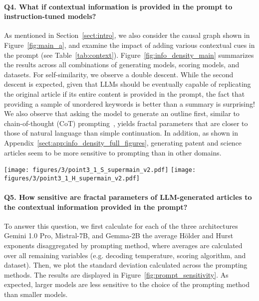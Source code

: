 \paragraph{Q4. What if contextual information is provided in the prompt to instruction-tuned models?}
As mentioned in Section~\ref{sect:intro}, we also consider the causal graph shown in Figure~\ref{fig:main_a}, and examine the impact of adding various contextual cues in the prompt (see Table~\ref{tab:context}). Figure~\ref{fig:info_density_main} summarizes the results across all combinations of generating models, scoring models, and datasets. For self-similarity, we observe a double descent. While the second descent is expected, given that LLMs should be eventually capable of replicating the original article if its entire content is provided in the prompt, the fact that providing a sample of unordered keywords is better than a summary is surprising! We also observe that asking the model to generate an outline first, similar to chain-of-thought (CoT) prompting~\citep{wei2023chainofthoughtpromptingelicitsreasoning}, yields fractal parameters that are closer to those of natural language than simple continuation. In addition, as shown in Appendix~\ref{sect:app:info_density_full_figures}, generating patent and science articles seem to be more sensitive to prompting than in other domains.

\begin{figure*}[t]
    \centering
    \texttt{[image: figures/3/point3\_1\_S\_supermain\_v2.pdf]}
    \texttt{[image: figures/3/point3\_1\_H\_supermain\_v2.pdf]}
    \caption{$y$-axis is the log of the ratio of the fractal parameters between LLM-generated texts and natural language, similar to Figure~\ref{fig:fractal_param_pt}. $x$-axis is from left to right the 7 prompting strategies in Table~\ref{tab:context} (top to bottom). Detailed results are in Appendix~\ref{sect:app:info_density_full_figures}.}
    \label{fig:info_density_main}
\end{figure*}

\paragraph{Q5. How sensitive are fractal parameters of LLM-generated articles to the contextual information provided in the prompt?} To answer this question, we first calculate for each of the three architectures Gemini 1.0 Pro, Mistral-7B, and Gemma-2B the average H\"older and Hurst exponents disaggregated by prompting method, where averages are calculated over all remaining variables (e.g. decoding temperature, scoring algorithm, and dataset). Then, we plot the standard deviation calculated across the prompting methods. The results are displayed in Figure~\ref{fig:prompt_sensitivity}. As expected, larger models are less sensitive to the choice of the prompting method than smaller models.

